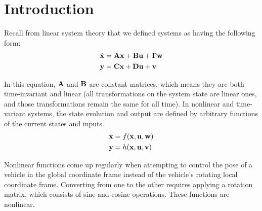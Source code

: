 \section{Introduction}

Recall from linear \gls{system} theory that we defined \glspl{system} as having
the following form:
\begin{align*}
  \dot{\mathbf{x}} &= \mathbf{A}\mathbf{x} + \mathbf{B}\mathbf{u} + \mathbf{\Gamma}\mathbf{w} \\
  \mathbf{y} &= \mathbf{C}\mathbf{x} + \mathbf{D}\mathbf{u} + \mathbf{v}
\end{align*}

In this equation, $\mathbf{A}$ and $\mathbf{B}$ are constant matrices, which means
they are both time-invariant and linear (all transformations on the \gls{system}
\gls{state} are linear ones, and those transformations remain the same for all
time). In nonlinear and time-variant \glspl{system}, the \gls{state} evolution
and \gls{output} are defined by arbitrary functions of the current \glspl{state}
and \glspl{input}.
\begin{align*}
  \dot{\mathbf{x}} &= f(\mathbf{x}, \mathbf{u}, \mathbf{w}) \\
  \mathbf{y} &= h(\mathbf{x}, \mathbf{u}, \mathbf{v})
\end{align*}

Nonlinear functions come up regularly when attempting to control the \gls{pose}
of a vehicle in the global coordinate frame instead of the vehicle's rotating
local coordinate frame. Converting from one to the other requires applying a
rotation matrix, which consists of sine and cosine operations. These functions
are nonlinear.
